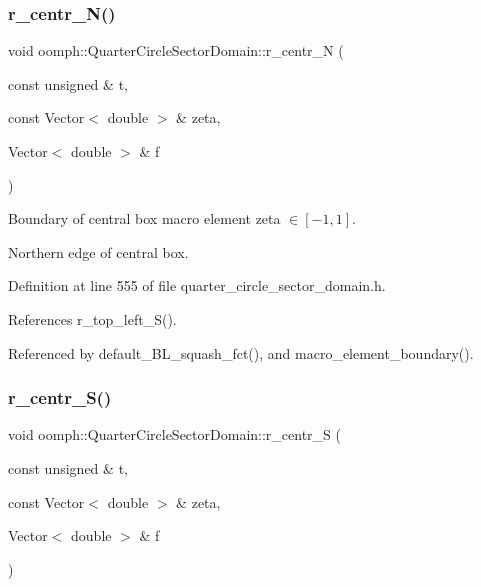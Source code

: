 \subsubsection{\texorpdfstring{r\+\_\+centr\+\_\+\+N()}{r\_centr\_N()}}
{\footnotesize\ttfamily void oomph\+::\+Quarter\+Circle\+Sector\+Domain\+::r\+\_\+centr\+\_\+N (\begin{DoxyParamCaption}\item[{const unsigned \&}]{t,  }\item[{const Vector$<$ double $>$ \&}]{zeta,  }\item[{Vector$<$ double $>$ \&}]{f }\end{DoxyParamCaption})\hspace{0.3cm}{\ttfamily [private]}}



Boundary of central box macro element zeta $ \in [-1,1] $. 

Northern edge of central box. 

Definition at line 555 of file quarter\+\_\+circle\+\_\+sector\+\_\+domain.\+h.



References r\+\_\+top\+\_\+left\+\_\+\+S().



Referenced by default\+\_\+\+B\+L\+\_\+squash\+\_\+fct(), and macro\+\_\+element\+\_\+boundary().

\mbox{\label{classoomph_1_1QuarterCircleSectorDomain_aaa17ff1d6529000f8309005396966830}} 
\subsubsection{\texorpdfstring{r\+\_\+centr\+\_\+\+S()}{r\_centr\_S()}}
{\footnotesize\ttfamily void oomph\+::\+Quarter\+Circle\+Sector\+Domain\+::r\+\_\+centr\+\_\+S (\begin{DoxyParamCaption}\item[{const unsigned \&}]{t,  }\item[{const Vector$<$ double $>$ \&}]{zeta,  }\item[{Vector$<$ double $>$ \&}]{f }\end{DoxyParamCaption})\hspace{0.3cm}{\ttfamily [private]}}



